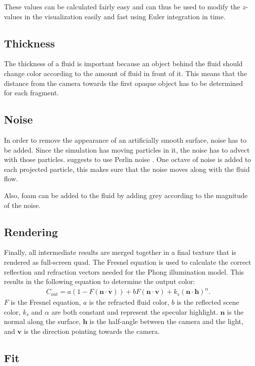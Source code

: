 These values can be calculated fairly easy and can thus be used to modify the \(z\)-values in the visualization easily and fast using Euler integration in time.

\subsection{Thickness}
The thickness of a fluid is important because an object behind the fluid should change color according to the amount of fluid in front of it.
This means that the distance from the camera towards the first opaque object has to be determined for each fragment.

\subsection{Noise}
In order to remove the appearance of an artificially smooth surface, noise has to be added.
Since the simulation has moving particles in it, the noise has to advect with those particles.
\cite{van2009screen} suggests to use Perlin noise \cite{perlin1985image}.
One octave of noise is added to each projected particle, this makes sure that the noise moves along with the fluid flow.

Also, foam can be added to the fluid by adding grey according to the magnitude of the noise.

\subsection{Rendering}
Finally, all intermediate results are merged together in a final texture that is rendered as full-screen quad.
The Fresnel equation is used to calculate the correct reflection and refraction vectors needed for the Phong \cite{phong1975illumination} illumination model.
This results in the following equation \cite{van2009screen}to determine the output color:
\begin{eqnarray}
C_{out} = a(1 - F(\mathbf{n} \cdot \mathbf{v})) + bF(\mathbf{n} \cdot \mathbf{v}) + k_s(\mathbf{n} \cdot \mathbf{h})^\alpha.
\end{eqnarray}
$F$ is the Fresnel equation, $a$ is the refracted fluid color, $b$ is the reflected scene color, $k_s$ and $\alpha$ are both constant and represent the specular highlight. $\mathbf{n}$ is the normal along the surface, $\mathbf{h}$ is the half-angle between the camera and the light, and $\mathbf{v}$ is the direction pointing towards the camera.


\subsection{Fit}